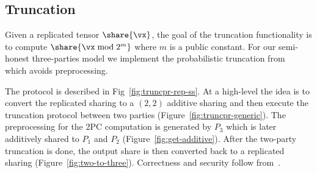 \subsection{Truncation}
\label{subsec:truncation}

Given a replicated tensor $\share{\vx}$, the goal of the truncation functionality is to compute $\share{\vx \bmod 2^m}$ where $m$ is a public constant.
For our semi-honest three-parties model we implement the probabilistic truncation from~\cite{PoPETS:DalEscKel20} which avoids preprocessing.

The protocol is described in Fig~\ref{fig:truncpr-rep-ss}. At a high-level the idea is to convert the replicated sharing to a $(2,2)$ additive sharing and then execute the truncation protocol between two parties (Figure~\ref{fig:truncpr-generic}). The preprocessing for the 2PC computation is generated by $P_3$ which is later additively shared to $P_1$ and $P_2$ (Figure~\ref{fig:get-additive}). After the two-party truncation is done, the output share is then converted back to a replicated sharing (Figure~\ref{fig:two-to-three}). Correctness and security follow from~\cite{PoPETS:DalEscKel20}.


